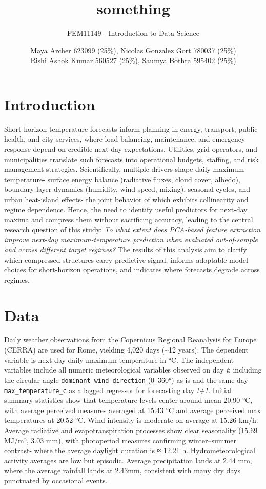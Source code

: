 \documentclass[
]{article}
\title{something}
\subtitle{FEM11149 - Introduction to Data Science}
\author{Maya Archer 623099 (25\%), Nicolas Gonzalez Gort 780037 (25\%)\\
Rishi Ashok Kumar 560527 (25\%), Saumya Bothra 595402 (25\%)}
\date{}
\begin{document}
\maketitle

\section{Introduction}\label{introduction}

Short horizon temperature forecasts inform planning in energy,
transport, public health, and city services, where load balancing,
maintenance, and emergency response depend on credible next-day
expectations. Utilities, grid operators, and municipalities translate
such forecasts into operational budgets, staffing, and risk management
strategies. Scientifically, multiple drivers shape daily maximum
temperature- surface energy balance (radiative fluxes, cloud cover,
albedo), boundary-layer dynamics (humidity, wind speed, mixing),
seasonal cycles, and urban heat-island effects- the joint behavior of
which exhibits collinearity and regime dependence. Hence, the need to
identify useful predictors for next-day maxima and compress them without
sacrificing accuracy, leading to the central research question of this
study: \emph{To what extent does PCA-based feature extraction improve
next-day maximum-temperature prediction when evaluated out-of-sample and
across different target regimes?} The results of this analysis aim to
clarify which compressed structures carry predictive signal, informs
adoptable model choices for short-horizon operations, and indicates
where forecasts degrade across regimes.

\section{Data}\label{data}

Daily weather observations from the Copernicus Regional Reanalysis for
Europe (CERRA) are used for Rome, yielding 4,020 days (\textasciitilde12
years). The dependent variable is next day daily maximum temperature in
°C. The independent variables include all numeric meteorological
variables observed on day \emph{t}; including the circular angle
\texttt{dominant\_wind\_direction} (0--360°) as is and the same-day
\texttt{max\_temperature\_c} as a lagged regressor for forecasting day
\emph{t+1}. Initial summary statistics show that temperature levels
center around mean 20.90 °C, with average perceived measures averaged at
15.43 °C and average perceived max temperatures at 20.52 °C. Wind
intensity is moderate on average at 15.26 km/h. Average radiative and
evapotranspiration processes show clear seasonality (15.69 MJ/m², 3.03
mm), with photoperiod measures confirming winter--summer contrast- where
the average daylight duration is ≈ 12.21 h. Hydrometeorological activity
averages are low but episodic. Average precipitation lands at 2.44 mm,
where the average rainfall lands at 2.43mm, consistent with many dry
days punctuated by occasional events.
\end{document}
